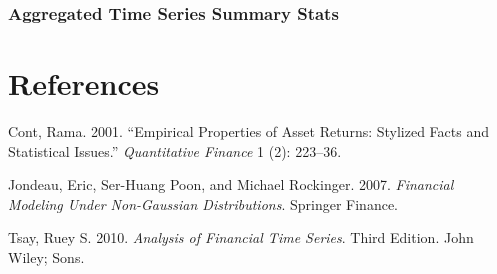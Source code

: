 \documentclass[11pt,]{article}
\begin{document}
\subsubsection{Aggregated Time Series Summary
Stats}\label{aggregated-time-series-summary-stats}

\section*{References}\label{references}

\hypertarget{refs}{}
\hypertarget{ref-Cont:2001}{}
Cont, Rama. 2001. ``Empirical Properties of Asset Returns: Stylized
Facts and Statistical Issues.'' \emph{Quantitative Finance} 1 (2):
223--36.

\hypertarget{ref-Jondeau_Poon_Rockinger:2007}{}
Jondeau, Eric, Ser-Huang Poon, and Michael Rockinger. 2007.
\emph{Financial Modeling Under Non-Gaussian Distributions}. Springer
Finance.

\hypertarget{ref-Tsay:2010}{}
Tsay, Ruey S. 2010. \emph{Analysis of Financial Time Series}. Third
Edition. John Wiley; Sons.
\end{document}
